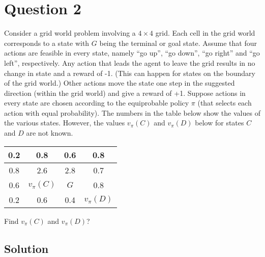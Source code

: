 \section*{Question 2}

Consider a grid world problem involving a \( 4 \times 4 \) grid.
Each cell in the grid world corresponds to a state with \( G \) being the terminal or goal state.
Assume that four actions are feasible in every state, namely ``go up'', ``go down'', ``go right'' and ``go left'', respectively.
Any action that leads the agent to leave the grid results in no change in state and a reward of -1.
(This can happen for states on the boundary of the grid world.)
Other actions move the state one step in the suggested direction (within the grid world) and give a reward of +1.
Suppose actions in every state are chosen according to the equiprobable policy \( \pi \) (that selects each action with equal probability).
The numbers in the table below show the values of the various states.
However, the values \( v_{\pi}(C) \) and \( v_{\pi}(D) \) below for states \( C \) and \( D \) are not known.
\begin{center}
    \begin{tabular}{|c|c|c|c|}
        \hline
        0.2 & 0.8              & 0.6     & 0.8              \\
        \hline
        0.8 & 2.6              & 2.8     & 0.7              \\
        \hline
        0.6 & \( v_{\pi}(C) \) & \( G \) & 0.8              \\
        \hline
        0.2 & 0.6              & 0.4     & \( v_{\pi}(D) \) \\
        \hline
    \end{tabular}
\end{center}
Find \( v_{\pi}(C) \) and \( v_{\pi}(D) \)?

\subsection*{Solution}
